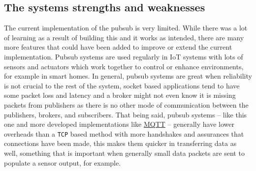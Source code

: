 \documentclass{article}
\newcommand{\code}[1]{\colorbox{light-gray}{\texttt{#1}}}
\begin{document}
    \subsection{The systems strengths and weaknesses}
    The current implementation of the pubsub is very limited. While there was a lot of learning as a result of building this and it works as intended, there are many more features that could have been added to improve or extend the current implementation. Pubsub systems are used regularly in IoT systems with lots of sensors and actuators which work together to control or enhance environments, for example in smart homes. In general, pubsub systems are great when reliability is not crucial to the rest of the system, socket based applications tend to have some packet loss and latency and a broker might not even know it is missing packets from publishers as there is no other mode of communication between the publishers, brokers, and subscribers. That being said, pubsub systems -- like this one and more developed implementations like \href{https://mqtt.org/}{MQTT} -- generally have lower overheads than a \code{TCP} based method with more handshakes and assurances that connections have been made, this makes them quicker in transferring data as well, something that is important when generally small data packets are sent to populate a sensor output, for example. 
\end{document}
